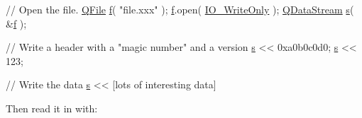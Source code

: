 \begin{DoxyCode}
\textcolor{comment}{// Open the file.}
\hyperlink{class_q_file}{QFile} \hyperlink{namespaceversion_adc2f36e5bef89e3881981af504e0e31d}{f}( \textcolor{stringliteral}{"file.xxx"} );
\hyperlink{namespaceversion_adc2f36e5bef89e3881981af504e0e31d}{f}.open( \hyperlink{qiodevice_8h_aee87f60968e118b038a637b83ccc4017}{IO\_WriteOnly} );
\hyperlink{class_q_data_stream}{QDataStream} \hyperlink{058__bracket__recursion_8tcl_a011c73f2dbb87635a3b4206c72355f6e}{s}( &\hyperlink{namespaceversion_adc2f36e5bef89e3881981af504e0e31d}{f} );

\textcolor{comment}{// Write a header with a "magic number" and a version}
\hyperlink{058__bracket__recursion_8tcl_a011c73f2dbb87635a3b4206c72355f6e}{s} << 0xa0b0c0d0;
\hyperlink{058__bracket__recursion_8tcl_a011c73f2dbb87635a3b4206c72355f6e}{s} << 123;

\textcolor{comment}{// Write the data}
\hyperlink{058__bracket__recursion_8tcl_a011c73f2dbb87635a3b4206c72355f6e}{s} << [lots of interesting data]
\end{DoxyCode}


Then read it in with\+:


